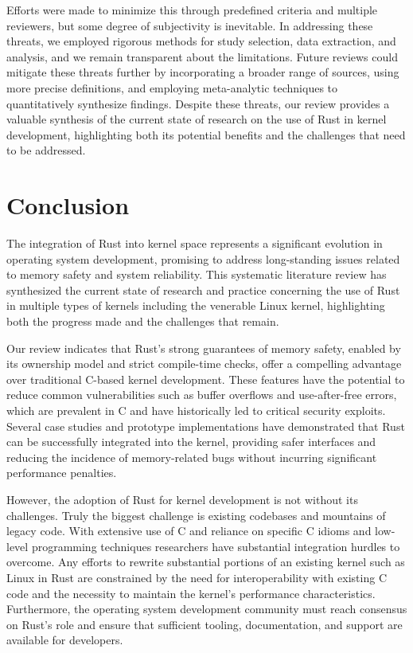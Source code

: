\documentclass[sigconf,review,anonymous]{acmart}
\begin{document}
Efforts were made to minimize this through predefined criteria and multiple reviewers, but some
degree of subjectivity is inevitable.  In addressing these threats, we employed rigorous methods for
study selection, data extraction, and analysis, and we remain transparent about the
limitations. Future reviews could mitigate these threats further by incorporating a broader range of
sources, using more precise definitions, and employing meta-analytic techniques to quantitatively
synthesize findings. Despite these threats, our review provides a valuable synthesis of the current
state of research on the use of Rust in kernel development, highlighting both its potential benefits
and the challenges that need to be addressed.

\section{Conclusion}

The integration of Rust into  kernel space represents a significant evolution in operating system
development, promising to address long-standing issues related to memory safety and system
reliability. This systematic literature review has synthesized the current state of research and
practice concerning the use of Rust in multiple types of kernels including the venerable Linux
kernel, highlighting both the progress made and the challenges that remain.

Our review indicates that Rust's strong guarantees of memory safety, enabled by its ownership model
and strict compile-time checks, offer a compelling advantage over traditional C-based kernel
development. These features have the potential to reduce common vulnerabilities such as buffer
overflows and use-after-free errors, which are prevalent in C and have historically led to critical
security exploits. Several case studies and prototype implementations have demonstrated that Rust
can be successfully integrated into the kernel, providing safer interfaces and reducing the
incidence of memory-related bugs without incurring significant performance penalties.

However, the adoption of Rust for kernel development is not without its challenges. Truly the
biggest challenge is existing codebases and mountains of legacy code. With extensive use of C and
reliance on specific C idioms and low-level programming techniques researchers have substantial
integration hurdles to overcome. Any efforts to rewrite substantial portions of an existing kernel
such as Linux in Rust are constrained by the need for interoperability with existing C code and the
necessity to maintain the kernel's performance characteristics. Furthermore, the operating system
development community must reach consensus on Rust's role and ensure that sufficient tooling,
documentation, and support are available for developers.
\end{document}
